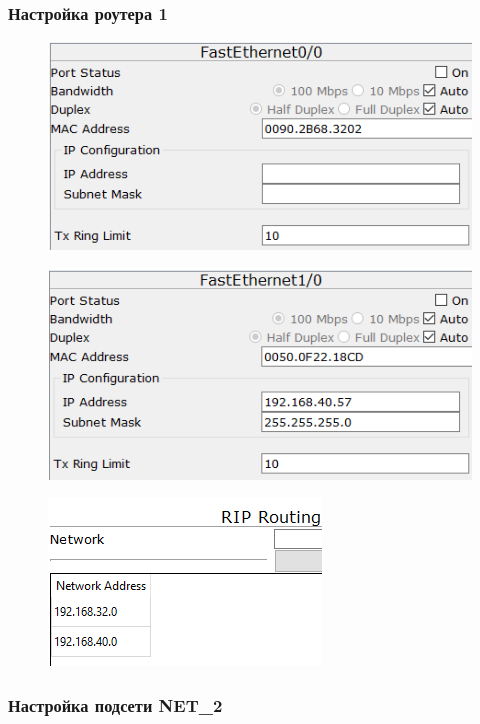 \documentclass[14pt,a4paper,report]{report}
\begin{document}
\subsubsection{Настройка роутера 1}

\begin{figure}[h!]
	\centering
	\includegraphics[scale = 0.85]{images/2_1.png}
\end{figure}

\begin{figure}[h!]
	\centering
	\includegraphics[scale = 0.85]{images/2_2.png}
\end{figure}

\begin{figure}[h!]
	\centering
	\includegraphics[scale = 0.85]{images/2_3.png}
\end{figure}

\clearpage

\subsubsection{Настройка подсети NET\_2}
\end{document}
